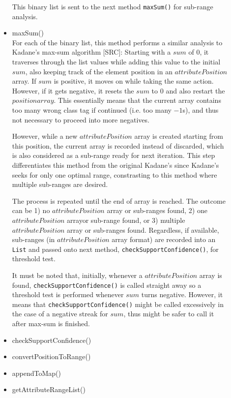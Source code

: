 \begin{description}
\begin{itemize}
	This binary list is sent to the next method \texttt{maxSum()} for sub-range analysis.
	
	\item{maxSum()} \\
	For each of the binary list, this method performs a similar analysis to Kadane's max-sum algorithm [SRC]: Starting with a $sum$ of $0$, it traverses through the list values while adding this value to the initial $sum$, also keeping track of the element position in an $attributePosition$ array. If $sum$ is positive, it moves on while taking the same action. However, if it gets negative, it resets the $sum$ to $0$ and also restart the $position array$. This essentially means that the current array contains too many wrong class tag if continued (i.e. too many $-1$s), and thus not necessary to proceed into more negatives. 
	
	However, while a new $attributePosition$ array is created starting from this position, the current array is recorded instead of discarded, which is also considered as a sub-range ready for next iteration. This step differentiates this method from the original Kadane's since Kadane's seeks for only one optimal range, constrasting to this method where multiple sub-ranges are desired.
	
	The process is repeated until the end of array is reached. The outcome can be 1) no $attributePosition$ array or sub-ranges found, 2) one $attributePosition$ arrayor sub-range found, or 3) multiple $attributePosition$ array or sub-ranges found. Regardless, if available, sub-ranges (in $attributePosition$ array format) are recorded into an \texttt{List} and passed onto next method, \texttt{checkSupportConfidence()}, for threshold test. 
	
	It must be noted that, initially, whenever a $attributePosition$ array is found, \texttt{checkSupportConfidence()} is called straight away so a threshold test is performed whenever $sum$ turns negative. However, it means that \texttt{checkSupportConfidence()} might be called excessively in the case of a negative streak for $sum$, thus might be safer to call it after max-sum is finished. 
	
	\item{checkSupportConfidence()} \\
		
	
	\item{convertPositionToRange()} \\
	\item{appendToMap()} \\
	\item{getAttributeRangeList()} \\
\end{itemize}
	


\end{description}
